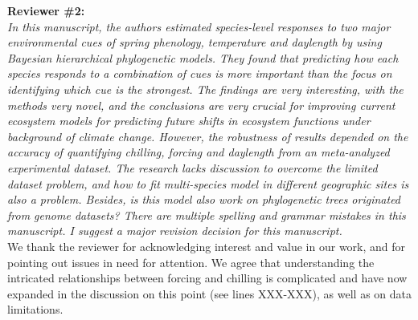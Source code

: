 \documentclass[11pt]{article}
\begin{document}
{\bf Reviewer \#2:}\\


\emph{In this manuscript, the authors estimated species-level responses to two major environmental cues of spring phenology, temperature and daylength by using Bayesian hierarchical phylogenetic models. They found that predicting how each species responds to a combination of cues is more important than the focus on identifying which cue is the strongest. The findings are very interesting, with the methods very novel, and the conclusions are very crucial for improving current ecosystem models for predicting future shifts in ecosystem functions under background of climate change. However, the robustness of results depended on the accuracy of quantifying chilling, forcing and daylength from an meta-analyzed experimental dataset. The research lacks discussion to overcome the limited dataset problem, and how to fit multi-species model in different geographic sites is also a problem. Besides, is this model also work on phylogenetic trees originated from genome datasets? There are multiple spelling and grammar mistakes in this manuscript. I suggest a major revision decision for this manuscript.}\\


We thank the reviewer for acknowledging interest and value in our work, and for pointing out issues in need for attention. We agree that understanding the intricated relationships between forcing and chilling is complicated and have now expanded in the discussion on this point (see lines XXX-XXX), as well as on data limitations.\\ 
\end{document}
